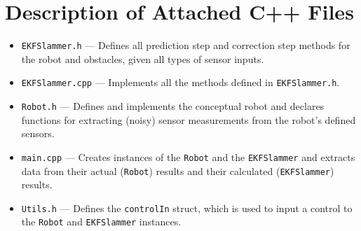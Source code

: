 \documentclass[journal]{IEEEtran}
\begin{document}
\section{Description of Attached C++ Files}
\begin{itemize}
 \item \texttt{EKFSlammer.h} --- Defines all prediction step and correction step methods for the robot
 and obstacles, given all types of sensor inputs. 
 \item \texttt{EKFSlammer.cpp} --- Implements all the methods defined in \texttt{EKFSlammer.h}.
 \item \texttt{Robot.h} --- Defines and implements the conceptual robot and declares functions for 
  extracting (noisy) sensor measurements from the robot's defined sensors.
 \item \texttt{main.cpp} --- Creates instances of the \texttt{Robot} and the \texttt{EKFSlammer} and extracts data from
  their actual (\texttt{Robot}) results and their calculated (\texttt{EKFSlammer}) results.
 \item \texttt{Utils.h} --- Defines the \texttt{controlIn} struct, which is used to input a control to the \texttt{Robot}
  and \texttt{EKFSlammer} instances.
\end{itemize}




\ifCLASSOPTIONcaptionsoff
  \newpage
\fi




\end{document}
